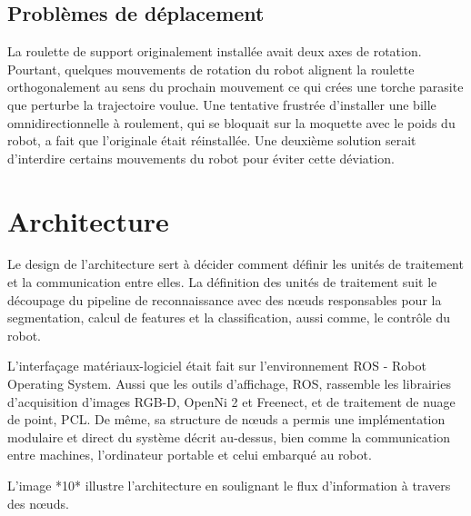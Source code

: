 \subsection{Problèmes de déplacement}


La roulette de support originalement installée avait deux axes de
rotation. Pourtant, quelques mouvements de rotation du robot alignent
la roulette orthogonalement au sens du prochain mouvement ce qui crées
une torche parasite que perturbe la trajectoire voulue. Une tentative
frustrée d'installer une bille omnidirectionnelle à roulement, qui se
bloquait sur la moquette avec le poids du robot, a fait que
l'originale était réinstallée. Une deuxième solution serait d'interdire
certains mouvements du robot pour éviter cette déviation.



\section{Architecture}

Le design de l'architecture sert à décider comment définir les unités de traitement et la communication entre elles. La définition des unités de traitement suit le découpage du pipeline de reconnaissance avec des nœuds responsables pour la segmentation, calcul de features et la classification, aussi comme, le contrôle du robot.

L'interfaçage matériaux-logiciel était fait sur l'environnement ROS -
Robot Operating System. Aussi que les outils d'affichage, ROS, 
rassemble les librairies d'acquisition d'images RGB-D, OpenNi 2 et Freenect, et de traitement de nuage de point, PCL.
De même, sa structure de nœuds a permis une implémentation modulaire et direct du
système décrit au-dessus, bien comme la communication entre machines, l'ordinateur portable et celui embarqué au robot.

L'image *10* illustre l'architecture en soulignant le flux d'information à travers des nœuds.